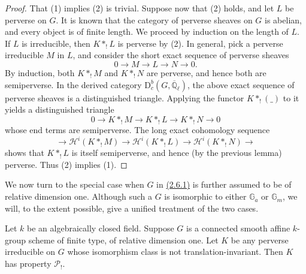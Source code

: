 \begin{proof}
That (1) implies (2) is trivial. Suppose now that (2) holds, and let \(L\) be
perverse on \(G\). It is known \cite[1.3.6 and 4.3.1(i)]{BBD} that the
category of perverse sheaves on \(G\) is abelian, and every object is of finite
length. We proceed by induction on the length of \(L\). If \(L\) is
irreducible, then \(K*_!L\) is perverse by (2). In general, pick a perverse
irreducible \(M\) in \(L\), and consider the short exact sequence of perverse
sheaves
\[
  0\to M\to L\to N\to0.
\]
By induction, both \(K*_!M\) and \(K*_!N\) are perverse, and hence both are
semiperverse. In the derived category
\(\mathrm{D}^b_c(G,\overline{\mathbb{Q}}_\ell)\), the above exact sequence of
perverse sheaves is a distinguished triangle. Applying the functor
\(K*_!(\_)\) to it yields a distinguished triangle
\[
  0\to K*_!M\to K*_!L\to K*_!N\to0
\]
whose end terms are semiperverse. The long exact cohomology sequence
\[
  \to\mathcal{H}^i(K*_!M)\to
  \mathcal{H}^i(K*_!L)\to
  \mathcal{H}^i(K*_!N)\to
\]
shows that \(K*_!L\) is itself semiperverse, and hence (by the previous lemma)
perverse. Thus (2) implies (1).
\end{proof}


We now turn to the special case when \(G\) in \hyperref[par:2.6.1]{(2.6.1)} is further assumed to be of
relative dimension one. Although such a \(G\) is isomorphic to either
\(\mathbb{G}_a\) or \(\mathbb{G}_m\), we will, to the extent possible, give a
unified treatment of the two cases.

Let \(k\) be an algebraically closed field. Suppose \(G\) is a connected smooth
affine \(k\)-group scheme of finite type, of relative dimension one. Let \(K\)
be any perverse irreducible on \(G\) whose isomorphism class is not
translation-invariant. Then \(K\) has property \(\mathcal{P}_!\).

